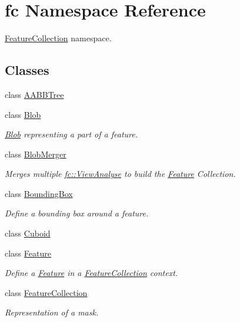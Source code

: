 \hypertarget{namespacefc}{}\section{fc Namespace Reference}
\label{namespacefc}


\hyperlink{classfc_1_1FeatureCollection}{Feature\+Collection} namespace.  


\subsection*{Classes}
\begin{DoxyCompactItemize}
\item 
class \hyperlink{classfc_1_1AABBTree}{A\+A\+B\+B\+Tree}
\item 
class \hyperlink{classfc_1_1Blob}{Blob}
\begin{DoxyCompactList}\small\item\em \hyperlink{classfc_1_1Blob}{Blob} representing a part of a feature. \end{DoxyCompactList}\item 
class \hyperlink{classfc_1_1BlobMerger}{Blob\+Merger}
\begin{DoxyCompactList}\small\item\em Merges multiple \hyperlink{classfc_1_1ViewAnalyse}{fc\+::\+View\+Analyse} to build the \hyperlink{classfc_1_1Feature}{Feature} Collection. \end{DoxyCompactList}\item 
class \hyperlink{classfc_1_1BoundingBox}{Bounding\+Box}
\begin{DoxyCompactList}\small\item\em Define a bounding box around a feature. \end{DoxyCompactList}\item 
class \hyperlink{classfc_1_1Cuboid}{Cuboid}
\item 
class \hyperlink{classfc_1_1Feature}{Feature}
\begin{DoxyCompactList}\small\item\em Define a \hyperlink{classfc_1_1Feature}{Feature} in a \hyperlink{classfc_1_1FeatureCollection}{Feature\+Collection} context. \end{DoxyCompactList}\item 
class \hyperlink{classfc_1_1FeatureCollection}{Feature\+Collection}
\begin{DoxyCompactList}\small\item\em Representation of a mask. \end{DoxyCompactList}\item 

\end{DoxyCompactItemize}
